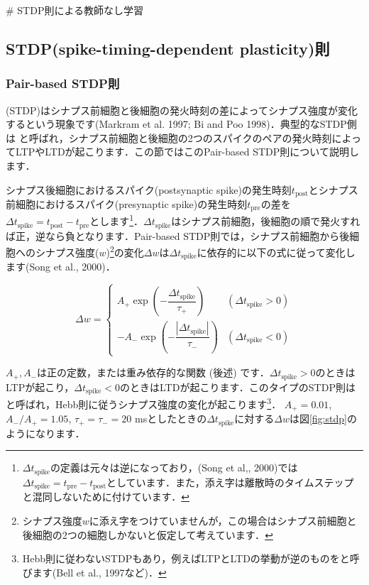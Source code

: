 # STDP則による教師なし学習
\subsection{STDP(spike-timing-dependent plasticity)則}
\subsubsection{Pair-based STDP則}
\textbf{} (STDP)はシナプス前細胞と後細胞の発火時刻の差によってシナプス強度が変化するという現象です(Markram et al. 1997; Bi and Poo 1998)．典型的なSTDP側は \textbf{} と呼ばれ，シナプス前細胞と後細胞の2つのスパイクのペアの発火時刻によってLTPやLTDが起こります．この節ではこのPair-based STDP則について説明します．

シナプス後細胞におけるスパイク(postsynaptic spike)の発生時刻$t_\text{post}$とシナプス前細胞におけるスパイク(presynaptic spike)の発生時刻$t_\text{pre}$の差を$\Delta t_{\text{spike}}=t_\text{post}-t_\text{pre}$とします\footnote{$\Delta t_{\text{spike}}$の定義は元々は逆になっており，(Song et al,, 2000)では$\Delta t_{\text{spike}}=t_\text{pre}-t_\text{post}$としています．また，添え字は離散時のタイムステップと混同しないために付けています．}．$\Delta t_{\text{spike}}$はシナプス前細胞，後細胞の順で発火すれば正，逆なら負となります．Pair-based STDP則では，シナプス前細胞から後細胞へのシナプス強度($w$)\footnote{シナプス強度$w$に添え字をつけていませんが，この場合はシナプス前細胞と後細胞の2つの細胞しかないと仮定して考えています．}の変化$\Delta w$は$\Delta t_{\text{spike}}$に依存的に以下の式に従って変化します(Song et al., 2000)．


\begin{equation}
\Delta w = \begin{cases}
A_{+} \exp\left(-\dfrac{\Delta t_{\text{spike}}}{\tau_{+}}\right) &(\Delta t_{\text{spike}}> 0) \\
-A_{-} \exp\left(-\dfrac{|\Delta t_{\text{spike}}|}{\tau_{-}}\right) &(\Delta t_{\text{spike}}< 0)
\end{cases}
\end{equation}


$A_+, A_-$は正の定数，または重み依存的な関数 (後述) です．$\Delta t_{\text{spike}}>0$のときはLTPが起こり，$\Delta t_{\text{spike}}<0$のときはLTDが起こります．このタイプのSTDP則は\textbf{} と呼ばれ，Hebb則に従うシナプス強度の変化が起こります\footnote{Hebb則に従わないSTDPもあり，例えばLTPとLTDの挙動が逆のものを\textbf{}と呼びます(Bell et al., 1997など)．}．
$A_+=0.01$, $A_-/A_+=1.05$, $\tau_{+}=\tau_{-}=20$ msとしたときの$\Delta t_{\text{spike}}$に対する$\Delta w$は図\ref{fig:stdp}のようになります．

